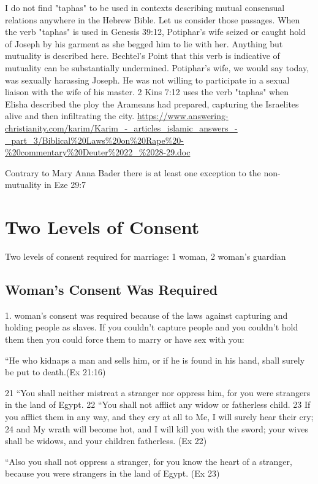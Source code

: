 \documentclass[11pt]{article}
\begin{document}
{	 	 	

I do not find "taphas" to be used in contexts describing mutual consensual relations anywhere in the Hebrew Bible. Let us consider those passages. When the verb "taphas" is used in Genesis 39:12, Potiphar's wife seized or caught hold of Joseph by his garment as she begged him to lie with her. Anything but mutuality is described here. Bechtel's Point that this verb is indicative of mutuality can be substantially undermined. Potiphar's wife, we would say today, was sexually harassing Joseph. He was not willing to participate in a sexual liaison with the wife of his master. 2 Kins 7:12 uses the verb "taphas" when Elisha described the ploy the Arameans had prepared, capturing the Israelites alive and then infiltrating the city. 
\url{https://www.answering-christianity.com/karim/Karim_-_articles_islamic_answers_-_part_3/Biblical%20Laws%20on%20Rape%20-%20commentary%20Deuter%2022_%2028-29.doc}


Contrary to Mary Anna Bader there is at least one exception to the non-mutuality in Eze 29:7


\section{Two Levels of Consent}
Two levels of consent required for marriage: 1 woman, 2 woman’s guardian

\subsection{Woman's Consent Was Required}

1. woman’s consent was required because of the laws against capturing and holding people as slaves. If you couldn’t capture people and you couldn’t hold them then you could force them to marry or have sex with you:

 “He who kidnaps a man and sells him, or if he is found in his hand, shall surely be put to death.(Ex 21:16)


21 “You shall neither mistreat a stranger nor oppress him, for you were strangers in the land of Egypt.
22 “You shall not afflict any widow or fatherless child. 23 If you afflict them in any way, and they cry at all to Me, I will surely hear their cry; 24 and My wrath will become hot, and I will kill you with the sword; your wives shall be widows, and your children fatherless. (Ex 22)


“Also you shall not oppress a stranger, for you know the heart of a stranger, because you were strangers in the land of Egypt. (Ex 23)


}
\end{document}
